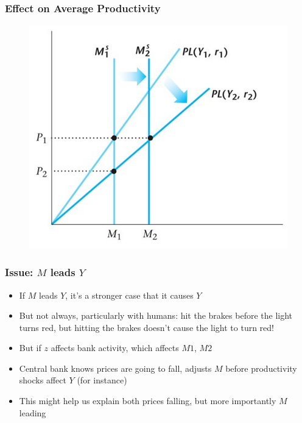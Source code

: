 \documentclass{beamer}
\begin{document}
\begin{frame}
\frametitle[alignment=center]{Effect on Average Productivity}
\begin{figure}
\centering
\includegraphics[scale=0.65]{Figures/W_Fig_13pt4.png}
\end{figure}
\end{frame}


\begin{frame}
\frametitle[alignment=center]{Issue: $M$ leads $Y$}
\begin{itemize}
\item If $M$ leads $Y$, it's a stronger case that it causes $Y$
\bigskip
\item But not always, particularly with humans: hit the brakes before the light turns red, but hitting the brakes doesn't cause the light to turn red!
\bigskip
\item But if $z$ affects bank activity, which affects $M1$, $M2$
\bigskip
\item Central bank knows prices are going to fall, adjusts $M$ before productivity shocks affect $Y$ (for instance)
\bigskip
\item This might help us explain both prices falling, but more importantly $M$ leading 
\end{itemize}
\end{frame}



\end{document}
